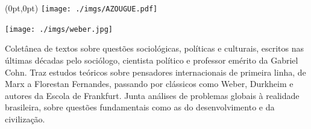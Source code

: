 \pagestyle{azougue}
\label{azougue}


\begin{textblock*}{5.625in}(0pt,0pt)%
\vspace*{-2.5cm}
\hspace*{-1.75cm}\texttt{[image: ./imgs/AZOUGUE.pdf]}
\end{textblock*}

\pagebreak

\hspace{.5cm}

\begin{center}
\hspace*{-.5cm}\texttt{[image: ./imgs/weber.jpg]}
\end{center}

\hspace*{-7cm}\hrulefill\hspace*{-7cm}

\medskip

\noindent{}Coletânea de textos sobre questões sociológicas, políticas e culturais, escritos nas últimas décadas pelo sociólogo, cientista político e professor emérito da  Gabriel Cohn. Traz estudos teóricos sobre pensadores internacionais de primeira linha, de Marx a Florestan Fernandes, passando por clássicos como Weber, Durkheim e autores da Escola de Frankfurt. Junta análises de problemas globais à realidade brasileira, sobre questões fundamentais como as do desenvolvimento e da civilização.

\vfill

\hspace*{-.4cm}\begin{minipage}[c]{1\linewidth}
\small{
{}}
\end{minipage}

\pagebreak

\hspace{.5cm}

